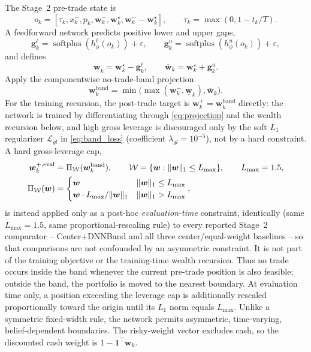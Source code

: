 \documentclass[a4paper,10pt]{article}
\newcommand{\bg}{\bm{g}}
\newcommand{\bw}{\bm{w}}
\newcommand{\bone}{\bm{1}}
\begin{document}
The Stage~2 pre-trade state is
\begin{equation}
o_k=[\tau_k,x_k^-,p_k,\bw_k^-,\bw_k^\star,\bw_k^--\bw_k^\star],
\qquad
\tau_k=\max(0,1-t_k/T).
\end{equation}
A feedforward network predicts positive lower and upper gaps,
\begin{equation}
\bg_k^\ell=\operatorname{softplus}(h_\phi^\ell(o_k))+\varepsilon,
\qquad
\bg_k^u=\operatorname{softplus}(h_\phi^u(o_k))+\varepsilon,
\end{equation}
and defines
\begin{equation}
\underline{\bw}_k=\bw_k^\star-\bg_k^\ell,
\qquad
\overline{\bw}_k=\bw_k^\star+\bg_k^u.
\end{equation}
Apply the componentwise no-trade-band projection
\begin{equation}
\bw_k^{\mathrm{band}}
=\min\bigl(\max(\bw_k^-,\underline{\bw}_k),\overline{\bw}_k\bigr).
\label{eq:projection}
\end{equation}
For the training recursion, the post-trade target is $\bw_k^+=\bw_k^{\mathrm{band}}$ directly: the network is trained by differentiating through \eqref{eq:projection} and the wealth recursion below, and high gross leverage is discouraged only by the soft $L_1$ regularizer $\mathcal L_{gl}$ in \eqref{eq:band_loss} (coefficient $\lambda_{gl}=10^{-5}$), not by a hard constraint. A hard gross-leverage cap,
\begin{align}
\bw_k^{+,\mathrm{eval}}
&=\Pi_{\mathcal W}(\bw_k^{\mathrm{band}}),
\qquad
\mathcal W=\{\bw:\|\bw\|_1\le L_{\max}\},
\qquad L_{\max}=1.5,
\notag\\
\Pi_{\mathcal W}(\bw)
&=\begin{cases}\bw & \|\bw\|_1\le L_{\max}\\ \bw\cdot L_{\max}/\|\bw\|_1 & \|\bw\|_1> L_{\max}\end{cases},
\label{eq:eval_projection}
\end{align}
is instead applied only as a post-hoc \emph{evaluation-time} constraint, identically (same $L_{\max}=1.5$, same proportional-rescaling rule) to every reported Stage~2 comparator -- Center+DNNBand and all three center/equal-weight baselines -- so that comparisons are not confounded by an asymmetric constraint. It is not part of the training objective or the training-time wealth recursion. Thus no trade occurs inside the band whenever the current pre-trade position is also feasible; outside the band, the portfolio is moved to the nearest boundary. At evaluation time only, a position exceeding the leverage cap is additionally rescaled proportionally toward the origin until its $L_1$ norm equals $L_{\max}$. Unlike a symmetric fixed-width rule, the network permits asymmetric, time-varying, belief-dependent boundaries. The risky-weight vector excludes cash, so the discounted cash weight is $1-\bone^\top\bw_k$.
\end{document}

